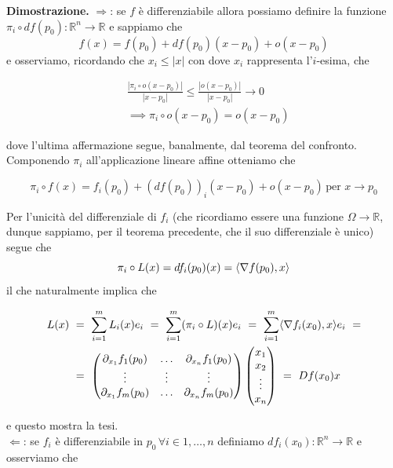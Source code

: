 \noindent \textbf{Dimostrazione. }
$\boxed{\Rightarrow}$: se $f$ è differenziabile allora possiamo definire la funzione $\pi_i \circ df(p_0): \mathbb{R}^n \to \mathbb{R}$ e sappiamo che
\begin{equation}
f(x) = f(p_0) + df(p_0)(x-p_0) + o(x-p_0) 
\label{eq:appl_aff}
\end{equation}
e osserviamo, ricordando che $x_i \leq |x|$ con dove $x_i$ rappresenta l'$i$-esima, che

\[\begin{aligned}
&\frac{|\pi_i \circ o(x-p_0)|}{|x-p_0|} \leq \frac{|o(x-p_0)|}{|x-p_0|} \to 0 \\
&\implies \pi_i \circ o(x-p_0) = o(x-p_0)
\end{aligned}\]

dove l'ultima affermazione segue, banalmente, dal teorema del confronto. \\
Componendo $\pi_i$ all'applicazione lineare affine otteniamo che

$$\pi_i \circ f(x) = f_i(p_0) + (df(p_0))_i (x-p_0) + o(x-p_0) \, \text{per } x \to p_0 $$

Per l'unicità del differenziale di $f_i$ (che ricordiamo essere una funzione $\Omega \to \mathbb{R}$, dunque sappiamo, per il teorema precedente, che il suo differenziale è unico) segue che
$$
\pi_i \circ L(x) = df_i(p_0)(x) = \langle \nabla{f(p_0)}, x \rangle
$$
il che naturalmente implica che

\[\begin{aligned}
L(x)\ &=\ \sum_{i=1}^m L_i(x) e_i\ =\ \sum_{i=1}^m (\pi_i \circ L)(x) e_i \ =\ \sum_{i=1}^m \langle \nabla{f_i(x_0)}, x \rangle e_i\ =\\
&=\ \begin{pmatrix} \partial_{x_1} f_1(p_0) & \ldots & \partial_{x_n} f_1(p_0) \\
\vdots & \vdots & \vdots \\
\partial_{x_1} f_m(p_0) & \ldots & \partial_{x_n} f_m(p_0)  \end{pmatrix} \begin{pmatrix}
x_1 \\
x_2 \\
\vdots \\
x_n
\end{pmatrix}
\ =\  Df(x_0)x
\end{aligned}\]

e questo mostra la tesi. \\
$\boxed{\Leftarrow}$: se $f_i$ è differenziabile in $p_0 \, \forall i \in 1, \ldots, n$ definiamo $df_i(x_0): \mathbb{R}^n \to \mathbb{R}$ e osserviamo che

